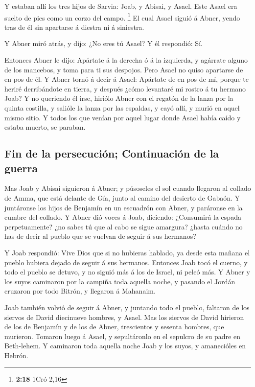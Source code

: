  Y estaban allí los tres hijos de Sarvia: Joab, y Abisai, y
Asael. Este Asael era suelto de pies como un corzo del campo.
\footnote{\textbf{2:18} 1Cró 2,16}  El cual Asael siguió á
Abner, yendo tras de él sin apartarse á diestra ni á siniestra.

 Y Abner miró atrás, y dijo: ¿No eres tú Asael? Y él
respondió: Sí.

 Entonces Abner le dijo: Apártate á la derecha ó á la
izquierda, y agárrate alguno de los mancebos, y toma para ti sus
despojos. Pero Asael no quiso apartarse de en pos de él.  Y
Abner tornó á decir á Asael: Apártate de en pos de mí, porque te heriré
derribándote en tierra, y después ¿cómo levantaré mi rostro á tu hermano
Joab?  Y no queriendo él irse, hiriólo Abner con el regatón
de la lanza por la quinta costilla, y salióle la lanza por las espaldas,
y cayó allí, y murió en aquel mismo sitio. Y todos los que venían por
aquel lugar donde Asael había caído y estaba muerto, se paraban.

\hypertarget{fin-de-la-persecuciuxf3n-continuaciuxf3n-de-la-guerra}{%
\subsection{Fin de la persecución; Continuación de la
guerra}\label{fin-de-la-persecuciuxf3n-continuaciuxf3n-de-la-guerra}}

 Mas Joab y Abisai siguieron á Abner; y púsoseles el sol
cuando llegaron al collado de Amma, que está delante de Gía, junto al
camino del desierto de Gabaón.  Y juntáronse los hijos de
Benjamín en un escuadrón con Abner, y paráronse en la cumbre del
collado.  Y Abner dió voces á Joab, diciendo: ¿Consumirá la
espada perpetuamente? ¿no sabes tú que al cabo se sigue amargura? ¿hasta
cuándo no has de decir al pueblo que se vuelvan de seguir á sus
hermanos?

 Y Joab respondió: Vive Dios que si no hubieras hablado, ya
desde esta mañana el pueblo hubiera dejado de seguir á sus hermanos.
 Entonces Joab tocó el cuerno, y todo el pueblo se detuvo,
y no siguió más á los de Israel, ni peleó más.  Y Abner y
los suyos caminaron por la campiña toda aquella noche, y pasando el
Jordán cruzaron por todo Bitrón, y llegaron á Mahanaim.

 Joab también volvió de seguir á Abner, y juntando todo el
pueblo, faltaron de los siervos de David diecinueve hombres, y Asael.
 Mas los siervos de David hirieron de los de Benjamín y de
los de Abner, trescientos y sesenta hombres, que murieron. Tomaron luego
á Asael, y sepultáronlo en el sepulcro de su padre en Beth-lehem.
 Y caminaron toda aquella noche Joab y los suyos, y
amanecióles en Hebrón.

